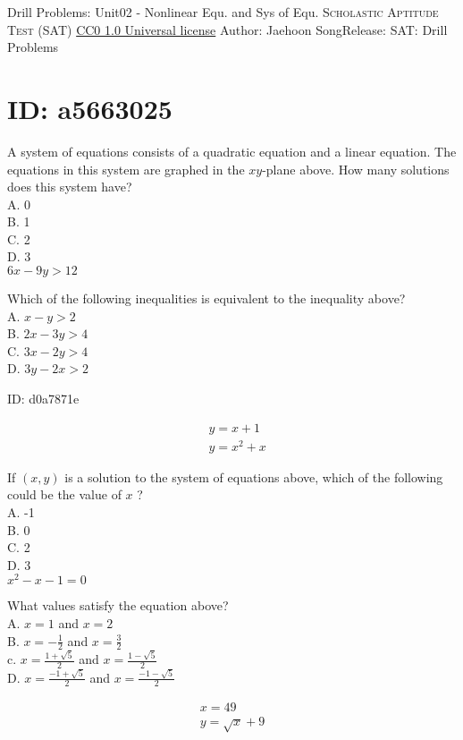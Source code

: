 \newpage\handout
{Drill Problems: Unit02 - Nonlinear Equ. and Sys of Equ.}
{\textsc{Scholastic Aptitude Test (SAT)}}
{\href{https://creativecommons.org/publicdomain/zero/1.0/}{CC0 1.0 Universal license}}
{Author: Jaehoon Song}{Release: \generatedOn}
{SAT: Drill Problems}

\section*{ID: a5663025}


A system of equations consists of a quadratic equation and a linear equation. The equations in this system are graphed in the $x y$-plane above. How many solutions does this system have?\\
A. 0\\
B. 1\\
C. 2\\
D. 3\\
$6 x-9 y>12$

Which of the following inequalities is equivalent to the inequality above?\\
A. $x-y>2$\\
B. $2 x-3 y>4$\\
C. $3 x-2 y>4$\\
D. $3 y-2 x>2$

ID: d0a7871e

$$
\begin{aligned}
& y=x+1 \\
& y=x^{2}+x
\end{aligned}
$$

If $(x, y)$ is a solution to the system of equations above, which of the following could be the value of $x$ ?\\
A. -1\\
B. 0\\
C. 2\\
D. 3\\
$x^{2}-x-1=0$

What values satisfy the equation above?\\
A. $x=1$ and $x=2$\\
B. $x=-\frac{1}{2}$ and $x=\frac{3}{2}$\\
c. $x=\frac{1+\sqrt{5}}{2}$ and $x=\frac{1-\sqrt{5}}{2}$\\
D. $x=\frac{-1+\sqrt{5}}{2}$ and $x=\frac{-1-\sqrt{5}}{2}$

$$
\begin{gathered}
x=49 \\
y=\sqrt{x}+9
\end{gathered}
$$

